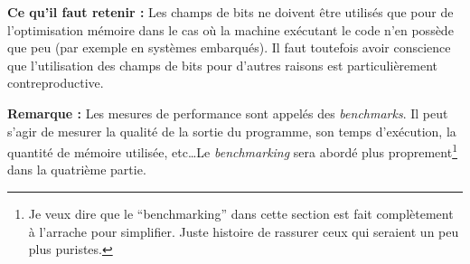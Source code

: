 \documentclass[../../../main.tex]{subfiles}
\begin{document}
\textbf{Ce qu'il faut retenir :} Les champs de bits ne doivent être utilisés que pour de l'optimisation mémoire dans le cas où la machine exécutant le code n'en possède que peu (par exemple en systèmes embarqués). Il faut toutefois avoir conscience que l'utilisation des champs de bits pour d'autres raisons est particulièrement contreproductive.

\textbf{Remarque :} Les mesures de performance sont appelés des \textit{benchmarks}. Il peut s'agir de mesurer la qualité de la sortie du programme, son temps d'exécution, la quantité de mémoire utilisée, etc\dots Le \textit{benchmarking} sera abordé plus proprement\footnote{Je veux dire que le ``benchmarking'' dans cette section est fait complètement à l'arrache pour simplifier. Juste histoire de rassurer ceux qui seraient un peu plus puristes.} dans la quatrième partie.
\end{document}
